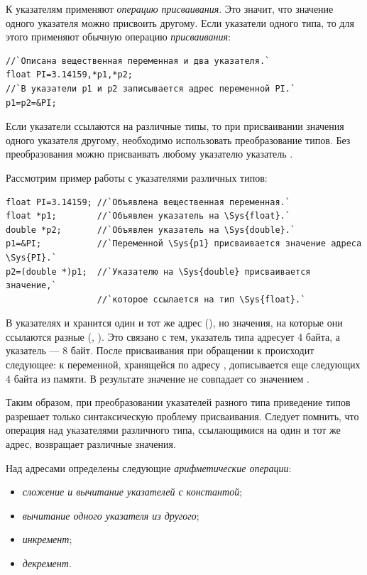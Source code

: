 К указателям применяют \emph{операцию присваивания}. Это значит, что значение
одного указателя можно присвоить другому. Если указатели одного типа, то для этого применяют обычную операцию
\emph{присваивания}: 
\begin{lstlisting}
//`Описана вещественная переменная и два указателя.`
float PI=3.14159,*p1,*p2;
//`В указатели p1 и p2 записывается адрес переменной PI.`
p1=p2=&PI;
\end{lstlisting}

Если указатели ссылаются на различные типы, то при присваивании значения одного указателя другому, необходимо
использовать преобразование типов. Без преобразования можно присваивать любому указателю указатель
. 

Рассмотрим пример работы с указателями различных типов:
\begin{lstlisting}
float PI=3.14159; //`Объявлена вещественная переменная.`
float *p1;        //`Объявлен указатель на \Sys{float}.`
double *p2;       //`Объявлен указатель на \Sys{double}.`
p1=&PI;           //`Переменной \Sys{p1} присваивается значение адреса \Sys{PI}.`
p2=(double *)p1;  //`Указателю на \Sys{double} присваивается значение,` 
                  //`которое ссылается на тип \Sys{float}.`
\end{lstlisting}

В указателях  и  хранится один и тот же адрес
(), но значения, на которые они ссылаются разные (,
). Это связано с тем, указатель типа  адресует 4 байта, а
указатель  --- 8 байт. После присваивания  при обращении к
 происходит следующее: к переменной, хранящейся по адресу , дописывается еще
следующих 4 байта из памяти. В результате значение  не совпадает со значением
.

Таким образом, при преобразовании указателей разного типа приведение типов разрешает только синтаксическую проблему
присваивания. Следует помнить, что операция \Sys{*} над указателями различного типа, ссылающимися на один
и тот же адрес, возвращает различные значения.

Над адресами  определены следующие
\emph{арифметические операции}:

\begin{itemize}
\item {}\emph{сложение и вычитание указателей с
константой};
\item {}\emph{вычитание одного указателя из другого};
\item {}\emph{инкремент};
\item {}\emph{декремент}.
\end{itemize}

